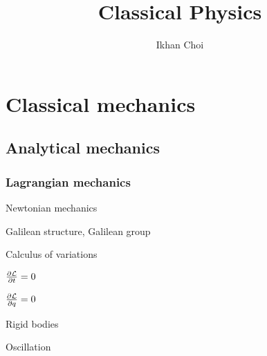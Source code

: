 \documentclass{../../large}
\begin{document}
\title{Classical Physics}
\author{Ikhan Choi}
\maketitle
\tableofcontents

\part{Classical mechanics}

\chapter{Analytical mechanics}

\section{Lagrangian mechanics}
Newtonian mechanics
\begin{prb}
Galilean structure, Galilean group
\end{prb}
\begin{prb}
\end{prb}

Calculus of variations
\begin{prb}
\end{prb}
\begin{prb}
$\pd{\cL}{t}=0$
\end{prb}
\begin{prb}
$\pd{\cL}{q}=0$
\end{prb}
\begin{prb}
\end{prb}

Rigid bodies
\begin{prb}
\end{prb}
\begin{prb}
\end{prb}
\begin{prb}
\end{prb}

Oscillation
\begin{prb}
\end{prb}
\begin{prb}
\end{prb}
\begin{prb}[Pendulum]
\end{prb}
\begin{prb}
\end{prb}
\begin{prb}
\end{prb}
\end{document}
